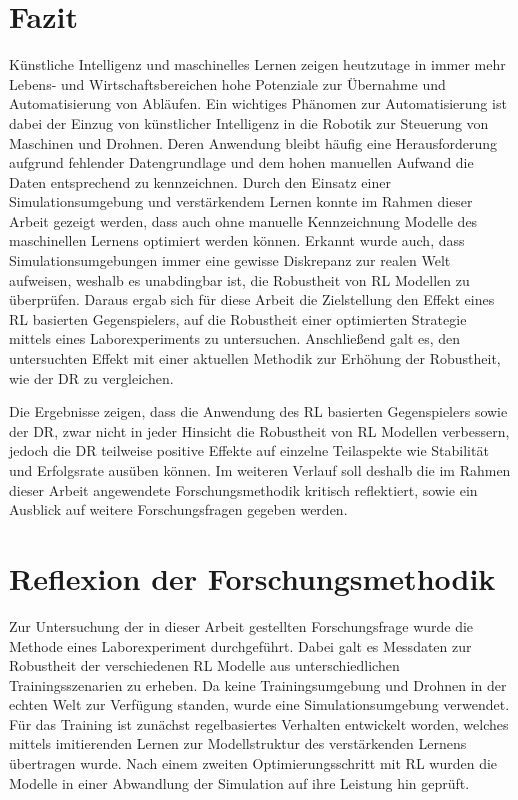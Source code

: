 \section{Fazit}
Künstliche Intelligenz und maschinelles Lernen zeigen heutzutage in immer mehr Lebens- und Wirtschaftsbereichen hohe Potenziale zur Übernahme und Automatisierung von Abläufen.
Ein wichtiges Phänomen zur Automatisierung ist dabei der Einzug von künstlicher Intelligenz in die Robotik zur Steuerung von Maschinen und Drohnen.
Deren Anwendung bleibt häufig eine Herausforderung aufgrund fehlender Datengrundlage und dem hohen manuellen Aufwand die Daten entsprechend zu kennzeichnen. 
Durch den Einsatz einer Simulationsumgebung und verstärkendem Lernen konnte im Rahmen dieser Arbeit gezeigt werden, dass auch ohne manuelle Kennzeichnung Modelle des maschinellen Lernens optimiert werden können.
Erkannt wurde auch, dass Simulationsumgebungen immer eine gewisse Diskrepanz zur realen Welt aufweisen, weshalb es unabdingbar ist, die Robustheit von RL Modellen zu überprüfen.
Daraus ergab sich für diese Arbeit die Zielstellung den Effekt eines RL basierten Gegenspielers, auf die Robustheit einer optimierten Strategie mittels eines Laborexperiments zu untersuchen.
Anschließend galt es, den untersuchten Effekt mit einer aktuellen Methodik zur Erhöhung der Robustheit, wie der DR zu vergleichen.

Die Ergebnisse zeigen, dass die Anwendung des RL basierten Gegenspielers sowie der DR, zwar nicht in jeder Hinsicht die Robustheit von RL Modellen verbessern, jedoch die DR teilweise positive Effekte auf einzelne Teilaspekte wie Stabilität und Erfolgsrate ausüben können.
Im weiteren Verlauf soll deshalb die im Rahmen dieser Arbeit angewendete Forschungsmethodik kritisch reflektiert, sowie ein Ausblick auf weitere Forschungsfragen gegeben werden.

\section{Reflexion der Forschungsmethodik}

Zur Untersuchung der in dieser Arbeit gestellten Forschungsfrage wurde die Methode eines Laborexperiment durchgeführt. 
Dabei galt es Messdaten zur Robustheit der verschiedenen RL Modelle aus unterschiedlichen Trainingsszenarien zu erheben.
Da keine Trainingsumgebung und Drohnen in der echten Welt zur Verfügung standen, wurde eine Simulationsumgebung verwendet. 
Für das Training ist zunächst regelbasiertes Verhalten entwickelt worden, welches mittels imitierenden Lernen zur Modellstruktur des verstärkenden Lernens übertragen wurde.
Nach einem zweiten Optimierungsschritt mit RL wurden die Modelle in einer Abwandlung der Simulation auf ihre Leistung hin geprüft.

